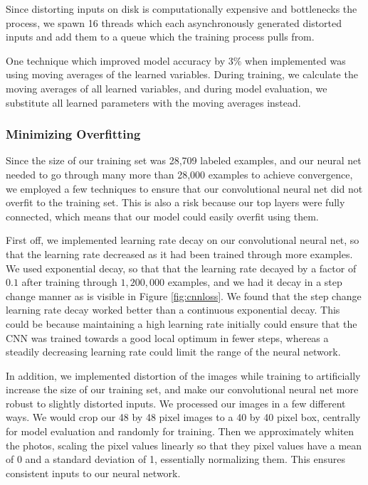 \documentclass[11pt, twocolumn, twoside]{article}
\begin{document}
Since distorting inputs on disk is computationally expensive and bottlenecks the process, we spawn 16 threads which each asynchronously generated distorted inputs and add them to a queue which the training process pulls from.

One technique which improved model accuracy by $3\%$ when implemented was using moving averages of the learned variables. During training, we calculate the moving averages of all learned variables, and during model evaluation, we substitute all learned parameters with the moving averages instead.


\subsubsection{Minimizing Overfitting} \label{overfitting}

Since the size of our training set was 28,709 labeled examples, and our neural net needed to go through many more than 28,000 examples to achieve convergence, we employed a few techniques to ensure that our convolutional neural net did not overfit to the training set. This is also a risk because our top layers were fully connected, which means that our model could easily overfit using them.

First off, we implemented learning rate decay on our convolutional neural net, so that the learning rate decreased as it had been trained through more examples. We used exponential decay, so that that the learning rate decayed by a factor of $0.1$ after training through $1,200,000$ examples, and we had it decay in a step change manner as is visible in Figure \ref{fig:cnnloss}. We found that the step change learning rate decay worked better than a continuous exponential decay. This could be because maintaining a high learning rate initially could ensure that the CNN was trained towards a good local optimum in fewer steps, whereas a steadily decreasing learning rate could limit the range of the neural network.

In addition, we implemented distortion of the images while training to artificially increase the size of our training set, and make our convolutional neural net more robust to slightly distorted inputs. We processed our images in a few different ways. We would crop our 48 by 48 pixel images to a 40 by 40 pixel box, centrally for model evaluation and randomly for training. Then we approximately whiten the photos, scaling the pixel values linearly so that they pixel values have a mean of 0 and a standard deviation of 1, essentially normalizing them. This ensures consistent inputs to our neural network.
\end{document}
